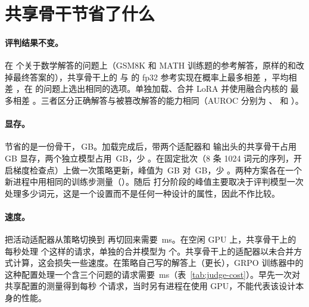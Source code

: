 
\section{共享骨干节省了什么}\label{sec:res-shared}

\paragraph{评判结果不变。} 在  个关于数学解答的问题上（GSM8K 和 MATH 训练题的参考解答，原样的和改掉最终答案的），共享骨干上的 \kev{} 与 \kev{} 的 fp32 参考实现在概率上最多相差 ，平均相差 ，在  的问题上选出相同的选项。单独加载、合并 LoRA 并使用融合内核的 \kev{} 最多相差 。三者区分正确解答与被篡改解答的能力相同（AUROC 分别为 、 和 ）。

\paragraph{显存。} 节省的是一份骨干，\,GB。加载完成后，带两个适配器和 \kev{} 输出头的共享骨干占用 \,GB 显存，两个独立模型占用 \,GB，少 。在固定批次（8 条 1024 词元的序列，开启梯度检查点）上做一次策略更新，峰值为 \,GB 对 \,GB，少 。两种方案各在一个新进程中用相同的训练步测量（）。随后 \kev{} 打分阶段的峰值主要取决于评判模型一次处理多少词元，这是一个设置而不是任何一种设计的属性，因此不作比较。

\paragraph{速度。} 把活动适配器从策略切换到 \kev{} 再切回来需要 \,ms。在空闲 GPU 上，共享骨干上的 \kev{} 每秒处理  个这样的请求，单独的合并模型为  个。共享骨干上的适配器以未合并方式计算，这会损失一些速度。在策略自己写的解答上（更长），GRPO 训练器中的这种配置处理一个含三个问题的请求需要 \,ms（表~\ref{tab:judge-cost}）。早先一次对共享配置的测量得到每秒  个请求，当时另有进程在使用 GPU，不能代表该设计本身的性能。

\begin{table}[t]
\centering\small

\caption{在空闲的 RTX PRO 6000 上，对同样  个基座策略解答（MATH-500 和 GSM8K 题目）做一次评判的代价。\kev{} 在一个请求中回答关于一个解答的三个第二部分问题；AR 评判每个问题需要一次前向传播；推理型评判先生成最多 2048 个词元的思考再作答。峰值：进程分配的 GPU 显存，含模型本身。}
\label{tab:judge-cost}
\end{table}
